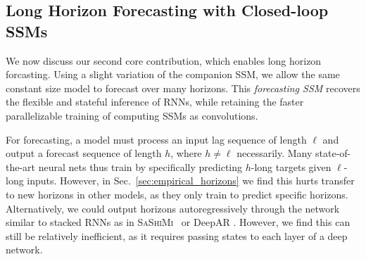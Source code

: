 %
\subsection{Long Horizon Forecasting with Closed-loop SSMs}
\label{sec:forecasting_ssm}

We now discuss our second core contribution, which enables long horizon forcasting. Using a slight variation of the companion SSM, we allow the same constant size \ourmethod{} model to forecast over many horizons. This \emph{forecasting SSM} recovers the flexible and stateful inference of RNNs, while retaining the faster parallelizable training of computing SSMs as convolutions. 


 For forecasting, a model must process an input lag sequence of length $\ell$ and output a forecast sequence of length $h$, where $h \neq \ell$ necessarily. 
%
Many state-of-the-art neural nets thus train by specifically predicting $h$-long targets given $\ell$-long inputs. 
However, in Sec.~\ref{sec:empirical_horizons} we find this hurts transfer to new horizons in other models, as they only train to predict specific horizons. 
%
Alternatively, we could output horizons autoregressively through the network similar to stacked RNNs as in \textsc{SaShiMi}~\citep{goel2022s} or DeepAR \citep{salinas2020deepar}. However, we find this can still be relatively inefficient, as it requires passing states to each layer of a deep network.

